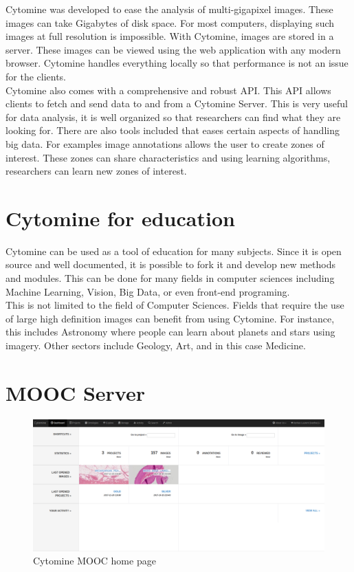 \documentclass[a4paper,11pt]{report}
\numberwithin{figure}{chapter} %
\begin{document}
Cytomine was developed to ease the analysis of multi-gigapixel images.
These images can take Gigabytes of disk space.
For most computers, displaying such images at full resolution is impossible.
With Cytomine, images are stored in a server.
These images can be viewed using the web application with any modern browser.
Cytomine handles everything locally so that performance is not an issue for the clients.\\

	Cytomine also comes with a comprehensive and robust API.
	This API allows clients to fetch and send data to and from a Cytomine Server.
	This is very useful for data analysis, it is well organized so that researchers can find what they are looking for.
	There are also tools included that eases certain aspects of handling big data.
	For examples image annotations allows the user to create zones of interest.
	These zones can share characteristics and using learning algorithms, researchers can learn new zones of interest.

\section{Cytomine for education}

Cytomine can be used as a tool of education for many subjects.
Since it is open source and well documented, it is possible to fork it and develop new methods and modules.
This can be done for many fields in computer sciences including Machine Learning, Vision, Big Data, or even front-end programing.\\

This is not limited to the field of Computer Sciences.
Fields that require the use of large high definition images can benefit from using Cytomine.
For instance, this includes Astronomy where people can learn about planets and stars using imagery.
Other sectors include Geology, Art, and in this case Medicine.


\section{MOOC Server}

      \begin{figure}[H]
      \centering
      \includegraphics[width=.95\linewidth]{images/cytomine_home.png}
      \caption{Cytomine MOOC home page}
      \end{figure}
\end{document}
